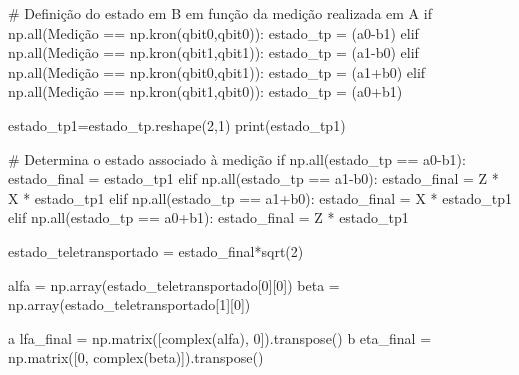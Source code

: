 \begin{pycode}
  # Definição do estado em B em função da medição realizada em A
  if np.all(Medição == np.kron(qbit0,qbit0)):
      estado_tp = (a0-b1)
  elif np.all(Medição == np.kron(qbit1,qbit1)):
      estado_tp = (a1-b0)
  elif np.all(Medição == np.kron(qbit0,qbit1)):
      estado_tp = (a1+b0)
  elif np.all(Medição == np.kron(qbit1,qbit0)):
      estado_tp = (a0+b1)
    
  estado_tp1=estado_tp.reshape(2,1)
  print(estado_tp1)

  # Determina o estado associado à medição
  if np.all(estado_tp == a0-b1):
      estado_final = estado_tp1
  elif np.all(estado_tp == a1-b0):
      estado_final = Z * X * estado_tp1
  elif np.all(estado_tp == a1+b0):
      estado_final = X * estado_tp1
  elif np.all(estado_tp == a0+b1):
      estado_final = Z * estado_tp1
    
  estado_teletransportado = estado_final*sqrt(2)

  alfa = np.array(estado_teletransportado[0][0])
  beta = np.array(estado_teletransportado[1][0])

a  lfa_final = np.matrix([complex(alfa), 0]).transpose()
b  eta_final = np.matrix([0, complex(beta)]).transpose()
\end{pycode}

